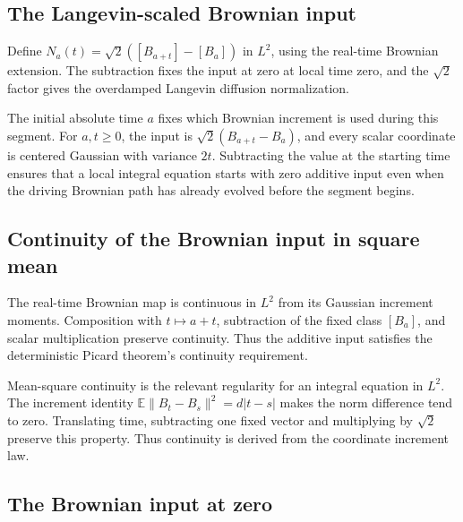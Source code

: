 \documentclass[11pt,a4paper]{report}
\begin{document}
\subsection{\texorpdfstring{The Langevin-scaled Brownian input}{The Langevin-scaled Brownian input}}
\label{report-step-UnadjustedLangevin-BrownianLangevin-lean-1}


Define \(N_a(t)=\sqrt2([B_{a+t}]-[B_a])\) in \(L^2\), using the real-time Brownian extension. The subtraction fixes the input at zero at local time zero, and the \(\sqrt2\) factor gives the overdamped Langevin diffusion normalization.



The initial absolute time \(a\) fixes which Brownian increment is used during this segment. For \(a,t\ge0\), the input is \(\sqrt2(B_{a+t}-B_a)\), and every scalar coordinate is centered Gaussian with variance \(2t\). Subtracting the value at the starting time ensures that a local integral equation starts with zero additive input even when the driving Brownian path has already evolved before the segment begins.

\subsection{\texorpdfstring{Continuity of the Brownian input in square mean}{Continuity of the Brownian input in square mean}}
\label{report-step-UnadjustedLangevin-BrownianLangevin-lean-2}


The real-time Brownian map is continuous in \(L^2\) from its Gaussian increment moments. Composition with \(t\mapsto a+t\), subtraction of the fixed class \([B_a]\), and scalar multiplication preserve continuity. Thus the additive input satisfies the deterministic Picard theorem's continuity requirement.



Mean-square continuity is the relevant regularity for an integral equation in \(L^2\). The increment identity \(\mathbb E\|B_t-B_s\|^2=d|t-s|\) makes the norm difference tend to zero. Translating time, subtracting one fixed vector and multiplying by \(\sqrt2\) preserve this property. Thus continuity is derived from the coordinate increment law.

\subsection{\texorpdfstring{The Brownian input at zero}{The Brownian input at zero}}
\label{report-step-UnadjustedLangevin-BrownianLangevin-lean-3}
\end{document}
